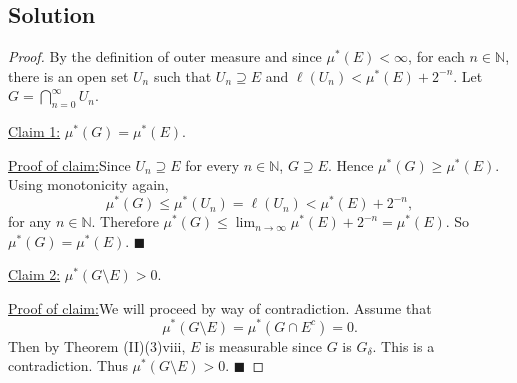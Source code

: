 \documentclass[12pt]{article}
\newenvironment{claimproof}[1]{\par\noindent\underline{Proof of claim:}\space#1}{\hfill $\blacksquare$}
\begin{document}
\subsection*{Solution}

\begin{proof}
By the definition of outer measure and since $\mu^{*}(E) < \infty$, for each $n \in \mathbb{N}$, there is an open set $U_{n}$ such that $U_{n}
\supseteq E$ and $\ell(U_{n}) < \mu^{*}(E) + 2^{-n}$. Let $G = \bigcap_{n=0}^{\infty}U_{n}$.

\underline{Claim 1:} $\mu^{*}(G) = \mu^{*}(E)$.

\begin{claimproof}
Since $U_{n} \supseteq E$ for every $n \in \mathbb{N}$, $G \supseteq E$. Hence $\mu^{*}(G) \geq \mu^{*}(E)$. Using monotonicity again,
\[ \mu^{*}(G) \leq \mu^{*}(U_{n}) = \ell(U_{n}) < \mu^{*}(E) + 2^{-n}, \]
for any $n \in \mathbb{N}$. Therefore $\mu^{*}(G) \leq \lim_{n\rightarrow\infty}\mu^{*}(E) + 2^{-n} = \mu^{*}(E)$. So $\mu^{*}(G) = \mu^{*}(E)$.
\end{claimproof}

\underline{Claim 2:} $\mu^{*}(G \setminus E) > 0$.

\begin{claimproof}
We will proceed by way of contradiction. Assume that 
\[ \mu^{*}(G\setminus E) = \mu^{*}(G\cap E^{c}) = 0.\] 
Then by Theorem (II)(3)viii, $E$ is
measurable since $G$ is $G_{\delta}$. This is a contradiction. Thus $\mu^{*}(G \setminus E) > 0$.
\end{claimproof}

\end{proof}
\end{document}
